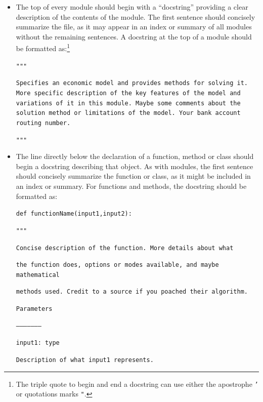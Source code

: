\documentclass[12pt,titlepage,letterpaper]{econtex}
\begin{document}
\begin{itemize}
\item The top of every module should begin with a ``docstring'' providing a clear description of the contents of the module.  The first sentence should concisely summarize the file, as it may appear in an index or summary of all modules without the remaining sentences.  A docstring at the top of a module should be formatted as:\footnote{The triple quote to begin and end a docstring can use either the apostrophe \texttt{'} or quotations marks \texttt{"}.}

\texttt{"""}

\texttt{Specifies an economic model and provides methods for solving it. More specific description of the key features of the model and variations of it in this module. Maybe some comments about the solution method or limitations of the model. Your bank account routing number.}

\texttt{"""}

\item The line directly below the declaration of a function, method or class should begin a docstring describing that object.  As with modules, the first sentence should concisely summarize the function or class, as it might be included in an index or summary.  For functions and methods, the docstring should be formatted as:

\texttt{def functionName(input1,input2):}

\hspace{0.9cm}\texttt{"""}

\hspace{0.9cm}\texttt{Concise description of the function.  More details about what}

\hspace{0.9cm}\texttt{the function does, options or modes available, and maybe mathematical}

\hspace{0.9cm}\texttt{methods used.  Credit to a source if you poached their algorithm.}

\vspace{0.5cm}

\hspace{0.9cm}\texttt{Parameters}

\hspace{0.9cm}\texttt{--------------------}

\hspace{0.9cm}\texttt{input1: type}

\hspace{1.8cm}\texttt{Description of what input1 represents.}


\end{itemize}
\end{document}

